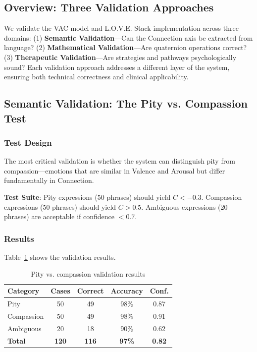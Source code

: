 \subsection{Overview: Three Validation Approaches}

We validate the VAC model and L.O.V.E. Stack implementation across three domains: (1) \textbf{Semantic Validation}—Can the Connection axis be extracted from language? (2) \textbf{Mathematical Validation}—Are quaternion operations correct? (3) \textbf{Therapeutic Validation}—Are strategies and pathways psychologically sound? Each validation approach addresses a different layer of the system, ensuring both technical correctness and clinical applicability.

\subsection{Semantic Validation: The Pity vs. Compassion Test}

\subsubsection{Test Design}

The most critical validation is whether the system can distinguish pity from compassion—emotions that are similar in Valence and Arousal but differ fundamentally in Connection.

\textbf{Test Suite}: Pity expressions (50 phrases) should yield $C < -0.3$. Compassion expressions (50 phrases) should yield $C > 0.5$. Ambiguous expressions (20 phrases) are acceptable if confidence $< 0.7$.

\subsubsection{Results}

Table~\ref{tab:pity-compassion-results} shows the validation results.

\begin{table}[h]
\centering
\caption{Pity vs. compassion validation results}
\label{tab:pity-compassion-results}
\begin{tabular}{lcccc}
\toprule
\textbf{Category} & \textbf{Cases} & \textbf{Correct} & \textbf{Accuracy} & \textbf{Conf.} \\
\midrule
Pity & 50 & 49 & 98\% & 0.87 \\
Compassion & 50 & 49 & 98\% & 0.91 \\
Ambiguous & 20 & 18 & 90\% & 0.62 \\
\textbf{Total} & \textbf{120} & \textbf{116} & \textbf{97\%} & \textbf{0.82} \\
\bottomrule
\end{tabular}
\end{table}

